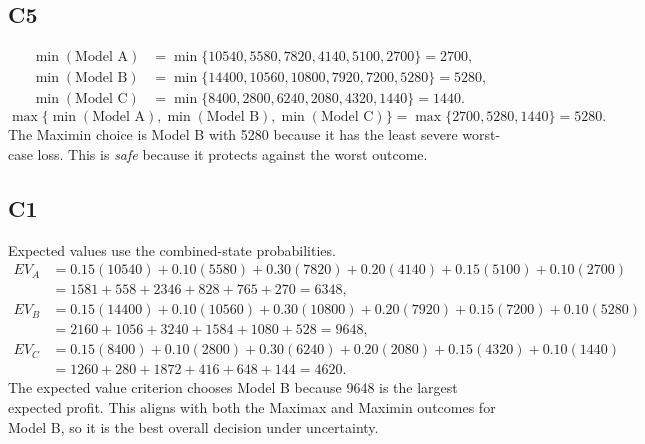 \begin{ExamProblems}
		\subsection*{C5}
		\[
		\begin{aligned}
		\min(\text{Model A}) &= \min\{10540,5580,7820,4140,5100,2700\} = 2700,\\
		\min(\text{Model B}) &= \min\{14400,10560,10800,7920,7200,5280\} = 5280,\\
		\min(\text{Model C}) &= \min\{8400,2800,6240,2080,4320,1440\} = 1440.
		\end{aligned}
		\]
		\[
		\max\{\min(\text{Model A}), \min(\text{Model B}), \min(\text{Model C})\}
		= \max\{2700, 5280, 1440\}
		= 5280.
		\]
		The Maximin choice is Model B with 5280 because it has the least severe worst-case loss. This is \emph{safe} because it protects against the worst outcome.

		\subsection*{C1}
		Expected values use the combined-state probabilities.
		\[
		\begin{aligned}
		EV_A &= 0.15(10540)+0.10(5580)+0.30(7820)+0.20(4140)+0.15(5100)+0.10(2700)\\
		&= 1581+558+2346+828+765+270=6348,\\
		EV_B &= 0.15(14400)+0.10(10560)+0.30(10800)+0.20(7920)+0.15(7200)+0.10(5280)\\
		&= 2160+1056+3240+1584+1080+528=9648,\\
		EV_C &= 0.15(8400)+0.10(2800)+0.30(6240)+0.20(2080)+0.15(4320)+0.10(1440)\\
		&= 1260+280+1872+416+648+144=4620.
		\end{aligned}
		\]
		The expected value criterion chooses Model B because 9648 is the largest expected profit. This aligns with both the Maximax and Maximin outcomes for Model B, so it is the best overall decision under uncertainty.
	\end{ExamProblems}

